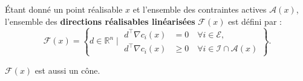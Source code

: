 \begin{definition}
    Étant donné un point réalisable $x$ et l'ensemble des contraintes actives $\mathcal{A}(x)$, l'ensemble des \textbf{directions réalisables linéarisées} $\mathcal{F}(x)$ est défini par :
    \begin{equation}
        \mathcal{F}(x) = \left\{ d \in \mathbb{R}^n \mid 
        \begin{aligned}
            d^\top \nabla c_i(x) &= 0 \quad \forall i \in \mathcal{E}, \\
            d^\top \nabla c_i(x) &\ge 0 \quad \forall i \in \mathcal{I} \cap \mathcal{A}(x)
        \end{aligned}
        \right\}.
    \end{equation}
\end{definition}

\begin{remarque}
    $\mathcal{F}(x)$ est aussi un cône.
\end{remarque}

